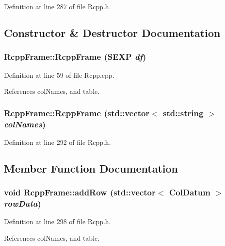 Definition at line 287 of file Rcpp.h.

\subsection{Constructor \& Destructor Documentation}
\hypertarget{classRcppFrame_a2aad548eb7d3842ea12da3c5a67bbfbc}{
\subsubsection[{RcppFrame}]{\setlength{\rightskip}{0pt plus 5cm}RcppFrame::RcppFrame (SEXP {\em df})}}
\label{classRcppFrame_a2aad548eb7d3842ea12da3c5a67bbfbc}


Definition at line 59 of file Rcpp.cpp.

References colNames, and table.\hypertarget{classRcppFrame_ad3caf84a0543c0f31a97705be8902358}{
\subsubsection[{RcppFrame}]{\setlength{\rightskip}{0pt plus 5cm}RcppFrame::RcppFrame (std::vector$<$ std::string $>$ {\em colNames})}}
\label{classRcppFrame_ad3caf84a0543c0f31a97705be8902358}


Definition at line 292 of file Rcpp.h.

\subsection{Member Function Documentation}
\hypertarget{classRcppFrame_aae72791527f2947a477633151106f42c}{
\subsubsection[{addRow}]{\setlength{\rightskip}{0pt plus 5cm}void RcppFrame::addRow (std::vector$<$ {\bf ColDatum} $>$ {\em rowData})}}
\label{classRcppFrame_aae72791527f2947a477633151106f42c}


Definition at line 298 of file Rcpp.h.

References colNames, and table.

